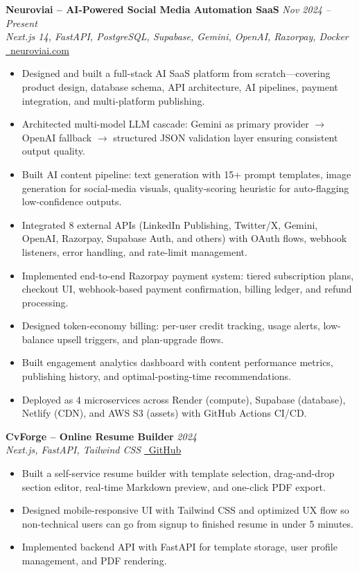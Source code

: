 \documentclass[11pt]{article}
\begin{document}
\textbf{Neuroviai -- AI-Powered Social Media Automation SaaS} \hfill \textit{Nov 2024 -- Present} \\
\textit{Next.js 14, FastAPI, PostgreSQL, Supabase, Gemini, OpenAI, Razorpay, Docker} \hfill \href{https://neuroviai.com}{\faGlobe\ neuroviai.com}
\begin{itemize}
\item Designed and built a full-stack AI SaaS platform from scratch---covering product design, database schema, API architecture, AI pipelines, payment integration, and multi-platform publishing.
\item Architected multi-model LLM cascade: Gemini as primary provider $\rightarrow$ OpenAI fallback $\rightarrow$ structured JSON validation layer ensuring consistent output quality.
\item Built AI content pipeline: text generation with 15+ prompt templates, image generation for social-media visuals, quality-scoring heuristic for auto-flagging low-confidence outputs.
\item Integrated 8 external APIs (LinkedIn Publishing, Twitter/X, Gemini, OpenAI, Razorpay, Supabase Auth, and others) with OAuth flows, webhook listeners, error handling, and rate-limit management.
\item Implemented end-to-end Razorpay payment system: tiered subscription plans, checkout UI, webhook-based payment confirmation, billing ledger, and refund processing.
\item Designed token-economy billing: per-user credit tracking, usage alerts, low-balance upsell triggers, and plan-upgrade flows.
\item Built engagement analytics dashboard with content performance metrics, publishing history, and optimal-posting-time recommendations.
\item Deployed as 4 microservices across Render (compute), Supabase (database), Netlify (CDN), and AWS S3 (assets) with GitHub Actions CI/CD.
\end{itemize}

\textbf{CvForge -- Online Resume Builder} \hfill \textit{2024} \\
\textit{Next.js, FastAPI, Tailwind CSS} \hfill \href{https://github.com/JeetInTech/CvForge-Online}{\faGithub\ GitHub}
\begin{itemize}
\item Built a self-service resume builder with template selection, drag-and-drop section editor, real-time Markdown preview, and one-click PDF export.
\item Designed mobile-responsive UI with Tailwind CSS and optimized UX flow so non-technical users can go from signup to finished resume in under 5 minutes.
\item Implemented backend API with FastAPI for template storage, user profile management, and PDF rendering.
\end{itemize}
\end{document}
